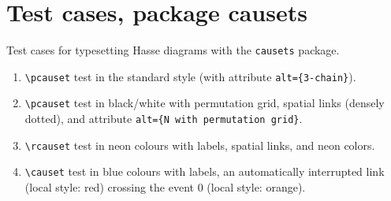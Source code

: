\documentclass{article}
\begin{document}
\section*{Test cases, package causets}
Test cases for typesetting Hasse diagrams with the \verb$causets$ package.

\begin{enumerate}
\item \verb$\pcauset$ test  in the standard style (with attribute \verb$alt={3-chain}$).
\item \verb$\pcauset$ test  in black/white with permutation grid, spatial links (densely dotted), and attribute \verb$alt={N with permutation grid}$.
\item \verb$\rcauset$ test  in neon colours with labels, spatial links, and neon colors.
\item \verb$\causet$ test  in blue colours with labels, an automatically interrupted link (local style: red) crossing the event 0 (local style: orange).
\end{enumerate}
\end{document}
